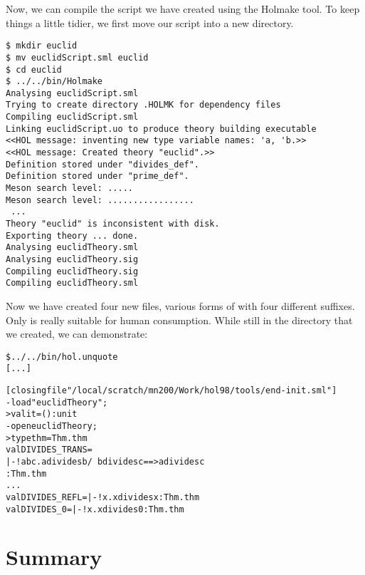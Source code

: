 Now, we can compile the script we have created using the
\textsf{Holmake} tool.  To keep things a little tidier, we first move
our script into a new directory.

\begin{session}
\begin{verbatim}
$ mkdir euclid
$ mv euclidScript.sml euclid
$ cd euclid
$ ../../bin/Holmake
Analysing euclidScript.sml
Trying to create directory .HOLMK for dependency files
Compiling euclidScript.sml
Linking euclidScript.uo to produce theory building executable
<<HOL message: inventing new type variable names: 'a, 'b.>>
<<HOL message: Created theory "euclid".>>
Definition stored under "divides_def".
Definition stored under "prime_def".
Meson search level: .....
Meson search level: .................
 ...
Theory "euclid" is inconsistent with disk.
Exporting theory ... done.
Analysing euclidTheory.sml
Analysing euclidTheory.sig
Compiling euclidTheory.sig
Compiling euclidTheory.sml
\end{verbatim}
\end{session}

Now we have created four new files, various forms of 
with four different suffixes.  Only  is really
suitable for human consumption.  While still in the 
directory that we created, we can demonstrate:

\begin{session}
\begin{alltt}
\$ ../../bin/hol.unquote
[...]

[closing file "/local/scratch/mn200/Work/hol98/tools/end-init.sml"]
- load "euclidTheory";
> val it = () : unit
- open euclidTheory;
> type thm = Thm.thm
  val DIVIDES_TRANS =
    |- !a b c. a divides b /\ b divides c ==> a divides c
    : Thm.thm
  ...
  val DIVIDES_REFL = |- !x. x divides x : Thm.thm
  val DIVIDES_0 = |- !x. x divides 0 : Thm.thm
\end{alltt}
\end{session}

\section{Summary}


